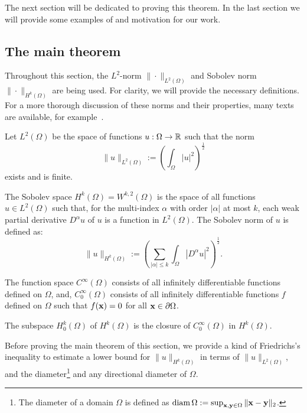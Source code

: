 The next section will be dedicated to proving this theorem. In the last section we will provide some examples of and motivation for our work.


\subsection{The main theorem} \label{sec:main_theorem}

Throughout this section, the $L^2$-norm $\|\cdot\|_{L^2(\Omega)}$ and Sobolev norm $\|\cdot\|_{H^k(\Omega)}$ are being used. For clarity, we will provide the necessary definitions. For a more thorough discussion of these norms and their properties, many texts are available, for example~\cite{adams_sobolev_2003}.

Let $L^2(\Omega)$ be the space of functions $u : \Omega \to \mathbb{R}$ such that the norm
$$
  \|u\|_{L^2(\Omega)} := \left(\int_\Omega \left| u \right|^2 \right)^{\frac{1}{2}}
$$
exists and is finite.

The Sobolev space $ H^k(\Omega) = W^{k, 2}(\Omega) $ is the space of all functions $u \in L^2(\Omega)$ such that, for the multi-index $\alpha$ with order $|\alpha|$ at most $k$, each weak partial derivative $D^\alpha u$ of $u$ is a function in $L^2(\Omega)$. The Sobolev norm of $u$ is defined as:
$$
  \|u\|_{H^k(\Omega)} := \left(\sum_{|\alpha| \leq k} \int_\Omega \left| D^\alpha u \right|^2\right)^{\frac{1}{2}}\text{.}
$$

The function space $C^\infty(\Omega)$ consists of all infinitely differentiable functions defined on $\Omega$, and, $C_0^\infty(\Omega)$ consists of all infinitely differentiable functions $f$ defined on $\Omega$ such that $f(\vb{x}) = 0$ for all $\vb{x} \in \partial\Omega$.

The subspace $ H^k_0(\Omega)$ of $H^k(\Omega)$ is the closure of $C_0^\infty(\Omega)$ in $H^k(\Omega)$.

Before proving the main theorem of this section, we provide a kind of Fried\-richs's inequality to estimate a lower bound for $\| u \|_{H^k(\Omega)}$ in terms of $\| u \|_{L^2(\Omega)}$, and the diameter\footnote{The diameter of a domain $\Omega$ is defined as $\operatorname{diam}\Omega := \sup_{\vb{x},\vb{y}\in \Omega} \|\vb{x} - \vb{y}\|_2$.} and any directional diameter of $\Omega$.

